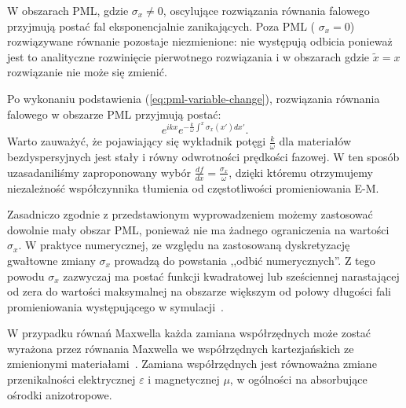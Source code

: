 W obszarach PML, gdzie $\sigma_x\ne0$, oscylujące rozwiązania równania falowego przyjmują postać fal eksponencjalnie zanikających. Poza PML ( $\sigma_x=0$) rozwiązywane równanie pozostaje niezmienione: nie występują odbicia ponieważ jest to analityczne rozwinięcie pierwotnego rozwiązania i w obszarach gdzie $\tilde{x}=x$ rozwiązanie nie może się zmienić.

Po wykonaniu podstawienia (\ref{eq:pml-variable-change}), rozwiązania równania falowego w obszarze PML przyjmują postać:
\begin{equation}
e^{ikx}e^{-\frac{k}{\omega}\int^x \sigma_x(x')dx'}.
\end{equation}
Warto zauważyć, że pojawiający się wykładnik potęgi $\frac{k}{\omega}$ dla materiałów bezdyspersyjnych jest stały i równy odwrotności prędkości fazowej. W ten sposób uzasadaniliśmy zaproponowany wybór $\frac{df}{dx}=\frac{\sigma_x}{\omega}$, dzięki któremu otrzymujemy niezależność współczynnika tłumienia od częstotliwości promieniowania E-M. 

Zasadniczo zgodnie z przedstawionym wyprowadzeniem możemy zastosować dowolnie mały obszar PML, ponieważ nie ma żadnego ograniczenia na wartości $\sigma_x$. W praktyce numerycznej, ze względu na zastosowaną dyskretyzację gwałtowne zmiany $\sigma_x$ prowadzą do powstania ,,odbić numerycznych''. Z tego powodu $\sigma_x$ zazwyczaj ma postać funkcji kwadratowej lub sześciennej narastającej od zera do wartości maksymalnej na obszarze większym od połowy długości fali promieniowania występującego w symulacji~\cite{johnson2008notes}.

W przypadku równań Maxwella każda zamiana współrzędnych może zostać wyrażona przez równania Maxwella we współrzędnych kartezjańskich ze zmienionymi materiałami~\cite{ward1996refraction}. Zamiana współrzędnych jest równoważna zmiane przenikalności elektrycznej $\varepsilon$ i magnetycznej $\mu$, w ogólności na absorbujące ośrodki anizotropowe. 


